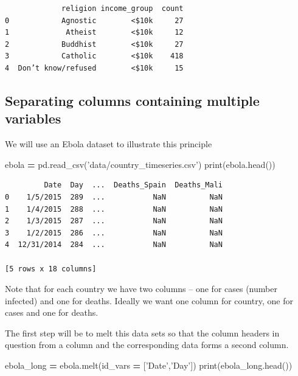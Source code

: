 \documentclass[
  letterpaper,
]{scrbook}
\newenvironment{Shaded}{\begin{snugshade}}{\end{snugshade}}
\newcommand{\BuiltInTok}[1]{#1}
\newcommand{\NormalTok}[1]{#1}
\newcommand{\OperatorTok}[1]{\textcolor[rgb]{0.81,0.36,0.00}{\textbf{#1}}}
\newcommand{\StringTok}[1]{\textcolor[rgb]{0.31,0.60,0.02}{#1}}
\begin{document}
\begin{verbatim}
             religion income_group  count
0            Agnostic        <$10k     27
1             Atheist        <$10k     12
2            Buddhist        <$10k     27
3            Catholic        <$10k    418
4  Don’t know/refused        <$10k     15
\end{verbatim}

\hypertarget{separating-columns-containing-multiple-variables}{%
\subsection{Separating columns containing multiple variables}\label{separating-columns-containing-multiple-variables}}

We will use an Ebola dataset to illustrate this principle

\begin{Shaded}
\begin{Highlighting}[]
\NormalTok{ebola }\OperatorTok{=}\NormalTok{ pd.read_csv(}\StringTok{'data/country_timeseries.csv'}\NormalTok{)}
\BuiltInTok{print}\NormalTok{(ebola.head())}
\end{Highlighting}
\end{Shaded}

\begin{verbatim}
         Date  Day  ...  Deaths_Spain  Deaths_Mali
0    1/5/2015  289  ...           NaN          NaN
1    1/4/2015  288  ...           NaN          NaN
2    1/3/2015  287  ...           NaN          NaN
3    1/2/2015  286  ...           NaN          NaN
4  12/31/2014  284  ...           NaN          NaN

[5 rows x 18 columns]
\end{verbatim}

Note that for each country we have two columns -- one for cases (number infected) and one for deaths. Ideally we want one column for country, one for cases and one for deaths.

The first step will be to melt this data sets so that the column headers in question from a column and the corresponding data forms a second column.

\begin{Shaded}
\begin{Highlighting}[]
\NormalTok{ebola_long }\OperatorTok{=}\NormalTok{ ebola.melt(id_vars }\OperatorTok{=}\NormalTok{ [}\StringTok{'Date'}\NormalTok{,}\StringTok{'Day'}\NormalTok{])}
\BuiltInTok{print}\NormalTok{(ebola_long.head())}
\end{Highlighting}
\end{Shaded}
\end{document}
